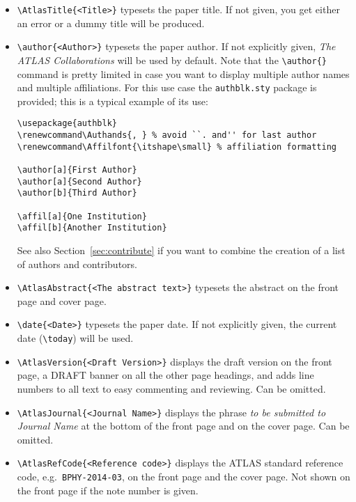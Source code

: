 \documentclass[atlasstyle,UKenglish]{latex/atlasdoc}
\begin{document}
\begin{itemize}
  \item {\verb|\AtlasTitle{<Title>}|} typesets the paper title. If not
    given, you get either an error or a dummy title will be produced.

  \item {\verb|\author{<Author>}|} typesets the paper author. If not
    explicitly given, \emph{The ATLAS Collaborations} will be used by
    default. Note that the \verb|\author{}| command is pretty limited
    in case you want to display multiple author names and multiple
    affiliations. For this use case the \verb|authblk.sty| package is
    provided; this is a typical example of its use:
    \begin{verbatim}
\usepackage{authblk}
\renewcommand\Authands{, } % avoid ``. and'' for last author
\renewcommand\Affilfont{\itshape\small} % affiliation formatting

\author[a]{First Author}
\author[a]{Second Author}
\author[b]{Third Author}

\affil[a]{One Institution}
\affil[b]{Another Institution}
    \end{verbatim}
    See also Section~\ref{sec:contribute} if you want to combine the creation of a list of authors and contributors.

  \item {\verb|\AtlasAbstract{<The abstract text>}|} typesets the
    abstract on the front page and cover page.

  \item {\verb|\date{<Date>}|} typesets the paper date. If not
    explicitly given, the current date (\verb|\today|) will be used.

  \item {\verb|\AtlasVersion{<Draft Version>}|} displays the draft
    version on the front page, a DRAFT banner on all the other page
    headings, and adds line numbers to all text to easy commenting and
    reviewing. Can be omitted.

  \item {\verb|\AtlasJournal{<Journal Name>}|} displays the phrase \emph{to
    be submitted to Journal Name} at the bottom of the front page and
    on the cover page. Can be omitted.

  \item {\verb|\AtlasRefCode{<Reference code>}|} displays the ATLAS
    standard reference code, e.g.\ \texttt{BPHY-2014-03}, on the front page and
    the cover page. Not shown on the front page if the note number is given.


\end{itemize}
\end{document}
